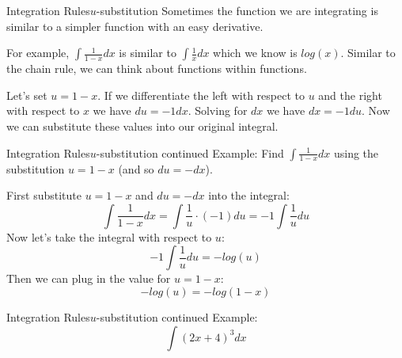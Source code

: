 \documentclass{beamer}
\begin{document}
\begin{frame}{Integration Rules}{$u$-substitution}
Sometimes the function we are integrating is similar to a simpler function with an easy derivative.\\
\vspace{3mm}

For example, $\int \frac{1}{1-x}dx$ is similar to $\int \frac{1}{x}dx$ which we know is $log(x)$.  Similar to the chain rule, we can think about functions within functions.

\vspace{3mm}
\pause
Let's set $u=1-x$.  If we differentiate the left with respect to $u$ and the right with respect to $x$ we have $du=-1dx$.  Solving for $dx$ we have $dx=-1du$.  Now we can substitute these values into our original integral.

\end{frame}

\begin{frame}{Integration Rules}{$u$-substitution continued}
Example: Find $\int \frac{1}{1-x}dx$ using the substitution $u=1-x$ (and so $du = -dx$).
\vspace{2mm}

First substitute $u=1-x$ and $du=-dx$ into the integral:
\[
\int \frac{1}{1-x}dx=\int\frac{1}{u}\cdot (-1)du=-1\int \frac{1}{u}du
\]
\pause
Now let's take the integral with respect to $u$:
\[
-1\int \frac{1}{u}du=-log(u)
\]
\pause
Then we can plug in the value for $u=1-x$:
\[
-log(u)=-log(1-x)
\]
\end{frame}

\begin{frame}{Integration Rules}{$u$-substitution continued}
Example: 
\[
\int (2x+4)^3dx\] %
\vspace{50mm}

\end{frame}
\end{document}
